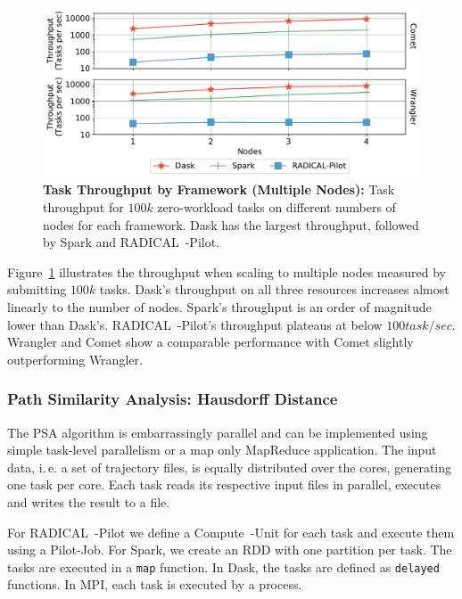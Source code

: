 \begin{figure}[t]
    \centering
    \includegraphics[width=.95\textwidth]{figures/data_analytics_hpc/task_par/daskVSsparkVSRpThroughput.pdf}
    \caption{\textbf{Task Throughput by Framework (Multiple Nodes):}
        Task throughput for $100k$ zero-workload tasks on different numbers of nodes for each framework. 
        Dask has the largest throughput, followed by Spark and RADICAL~-Pilot.}
    \label{fig:RP_Dask_Spark_throughput}
\end{figure}

Figure~\ref{fig:RP_Dask_Spark_throughput} illustrates the throughput when scaling to multiple nodes measured by submitting $100k$ tasks.
Dask's throughput on all three resources increases almost linearly to the number of nodes.
Spark's throughput is an order of magnitude lower than Dask's.
RADICAL~-Pilot's throughput plateaus at below $100 task/sec$.
Wrangler and Comet show a comparable performance with Comet slightly outperforming Wrangler.

\subsubsection{Path Similarity Analysis: Hausdorff Distance}
\label{sec:psa}
The PSA algorithm is embarrassingly parallel and can be implemented using simple task-level parallelism or a map only MapReduce application.
The input data, i.\,e. a set of trajectory files, is equally distributed over the cores, generating one task per core.
Each task reads its respective input files in parallel, executes and writes the result to a file.

For RADICAL~-Pilot we define a Compute~-Unit for each task and execute them using a Pilot-Job. 
For  Spark, we create an RDD with one partition per task. The tasks are executed 
in a \texttt{map} function. In Dask, the tasks are defined as \texttt{delayed} 
functions. In MPI, each task is executed by a process.

